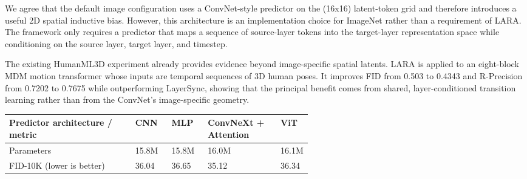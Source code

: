 \documentclass[10pt,letterpaper]{article}
\begin{document}
\begin{answerbox}

We agree that the default image configuration uses a ConvNet-style predictor on the (16x16) latent-token grid and therefore introduces a useful 2D spatial inductive bias. However, this architecture is an implementation choice for ImageNet rather than a requirement of LARA. The framework only requires a predictor that maps a sequence of source-layer tokens into the target-layer representation space while conditioning on the source layer, target layer, and timestep.


The existing HumanML3D experiment already provides evidence beyond image-specific spatial latents. LARA is applied to an eight-block MDM motion transformer whose inputs are temporal sequences of 3D human poses. It improves FID from 0.503 to 0.4343 and R-Precision from 0.7202 to 0.7675 while outperforming LayerSync, showing that the principal benefit comes from shared, layer-conditioned transition learning rather than from the ConvNet's image-specific geometry.


\begin{cleanTable}
\scriptsize
\begin{tabularx}{\linewidth}{Y C{0.12\linewidth} C{0.12\linewidth} C{0.24\linewidth} C{0.10\linewidth}}
\bfseries\color{white} Predictor architecture / metric & \bfseries\color{white} CNN & \bfseries\color{white} MLP & \bfseries\color{white} ConvNeXt + Attention & \bfseries\color{white} ViT \\
\midrule
Parameters & 15.8M & 15.8M & 16.0M & 16.1M \\
FID-10K (lower is better) & 36.04 & 36.65 & 35.12 & 36.34 \\
\end{tabularx}
\end{cleanTable}


\end{answerbox}
\end{document}
